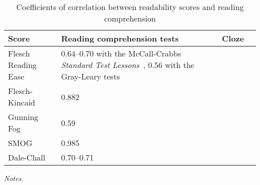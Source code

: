 \begin{table}
	\footnotesize
	\centering
	\begin{threeparttable}
		\caption{Coefficients of correlation between readability scores and reading comprehension}
		\label{table2}
		\begin{tabular}{p{4cm}p{4cm}p{4cm}p{4cm}}
			\toprule
			Score				&	Reading comprehension tests & Cloze										\\
			\midrule
			Flesch Reading Ease	& 0.64--0.70 with the McCall-Crabbs \textit{Standard Test Lessons}~\citep{Flesch1948,Powers1958}, 0.56 with the Gray-Leary tests~\ciptep{}&\\
			Flesch-Kincaid		& 0.882~\citep{Hull1979} \\
			Gunning Fog			& 0.59~\citep{Powers1958}&	\\
			SMOG				& 0.985~\citep{McLaughlin1969}&\\
			Dale-Chall			& 0.70--0.71~\citep{Dale1948} &\\
			\bottomrule
		\end{tabular}
		\begin{tablenotes}
			\tiny
			\item	\textit{Notes}. 
		\end{tablenotes}
	\end{threeparttable}
\end{table}
